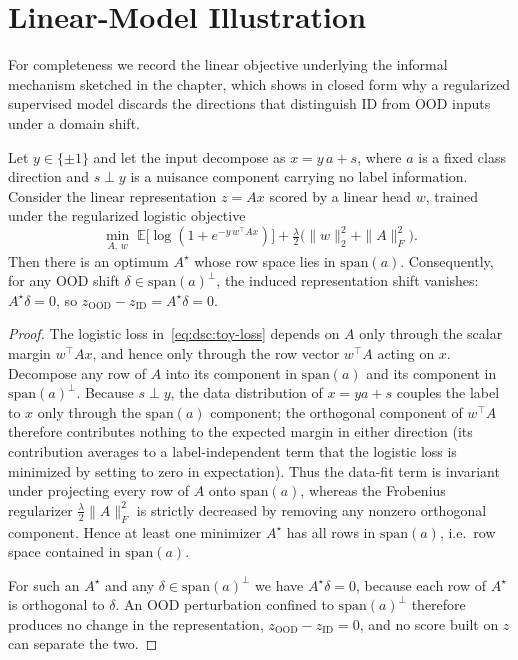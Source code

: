 \section{Linear-Model Illustration}
\label{sec:dsc-proofs:linear}

For completeness we record the linear objective underlying the informal
mechanism sketched in the chapter, which shows in closed form why a regularized
supervised model discards the directions that distinguish ID from OOD inputs
under a domain shift.

\begin{lemma}\label{lem:dsc:linear}
Let $y \in \{\pm 1\}$ and let the input decompose as $x = y\,a + s$, where
$a$ is a fixed class direction and $s \perp y$ is a nuisance component carrying
no label information. Consider the linear representation $z = Ax$ scored by a
linear head $w$, trained under the regularized logistic objective
\begin{equation} \min_{A,\,w}\;\mathbb{E}\bigl[\log(1 + e^{-y\,w^\top\! A x})\bigr] + \tfrac{\lambda}{2}\bigl(\|w\|_2^2 + \|A\|_F^2\bigr). \label{eq:dsc:toy-loss} \end{equation}
Then there is an optimum $A^\star$ whose row space lies in $\mathrm{span}(a)$.
Consequently, for any OOD shift $\delta \in \mathrm{span}(a)^\perp$, the
induced representation shift vanishes: $A^\star \delta = 0$, so
$z_{\mathrm{OOD}} - z_{\mathrm{ID}} = A^\star \delta = 0$.
\end{lemma}

\begin{proof}
The logistic loss in~\eqref{eq:dsc:toy-loss} depends on $A$ only through the
scalar margin $w^\top\! A x$, and hence only through the row vector $w^\top\! A$
acting on $x$. Decompose any row of $A$ into its component in $\mathrm{span}(a)$
and its component in $\mathrm{span}(a)^\perp$. Because $s \perp y$, the data
distribution of $x = y a + s$ couples the label to $x$ only through the
$\mathrm{span}(a)$ component; the orthogonal component of $w^\top\! A$ therefore
contributes nothing to the expected margin in either direction (its
contribution averages to a label-independent term that the logistic loss is
minimized by setting to zero in expectation). Thus the data-fit term is
invariant under projecting every row of $A$ onto $\mathrm{span}(a)$, whereas the
Frobenius regularizer $\tfrac{\lambda}{2}\|A\|_F^2$ is strictly decreased by
removing any nonzero orthogonal component. Hence at least one minimizer
$A^\star$ has all rows in $\mathrm{span}(a)$, i.e.\ row space contained in
$\mathrm{span}(a)$.

For such an $A^\star$ and any $\delta \in \mathrm{span}(a)^\perp$ we have
$A^\star \delta = 0$, because each row of $A^\star$ is orthogonal to $\delta$.
An OOD perturbation confined to $\mathrm{span}(a)^\perp$ therefore produces no
change in the representation, $z_{\mathrm{OOD}} - z_{\mathrm{ID}} = 0$, and no
score built on $z$ can separate the two.
\end{proof}

